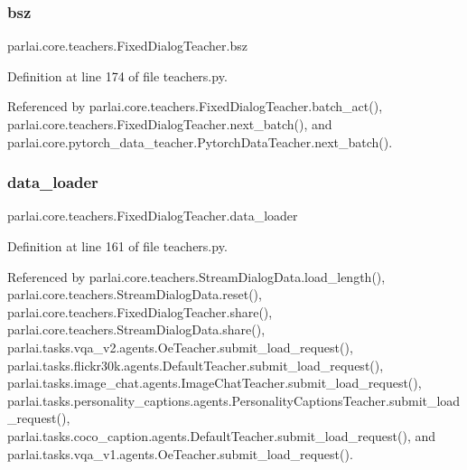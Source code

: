 \subsubsection{\texorpdfstring{bsz}{bsz}}
{\footnotesize\ttfamily parlai.\+core.\+teachers.\+Fixed\+Dialog\+Teacher.\+bsz}



Definition at line 174 of file teachers.\+py.



Referenced by parlai.\+core.\+teachers.\+Fixed\+Dialog\+Teacher.\+batch\+\_\+act(), parlai.\+core.\+teachers.\+Fixed\+Dialog\+Teacher.\+next\+\_\+batch(), and parlai.\+core.\+pytorch\+\_\+data\+\_\+teacher.\+Pytorch\+Data\+Teacher.\+next\+\_\+batch().

\mbox{\label{classparlai_1_1core_1_1teachers_1_1FixedDialogTeacher_a7edc6520195726382082a76486fa3747}} 
\subsubsection{\texorpdfstring{data\+\_\+loader}{data\_loader}}
{\footnotesize\ttfamily parlai.\+core.\+teachers.\+Fixed\+Dialog\+Teacher.\+data\+\_\+loader}



Definition at line 161 of file teachers.\+py.



Referenced by parlai.\+core.\+teachers.\+Stream\+Dialog\+Data.\+load\+\_\+length(), parlai.\+core.\+teachers.\+Stream\+Dialog\+Data.\+reset(), parlai.\+core.\+teachers.\+Fixed\+Dialog\+Teacher.\+share(), parlai.\+core.\+teachers.\+Stream\+Dialog\+Data.\+share(), parlai.\+tasks.\+vqa\+\_\+v2.\+agents.\+Oe\+Teacher.\+submit\+\_\+load\+\_\+request(), parlai.\+tasks.\+flickr30k.\+agents.\+Default\+Teacher.\+submit\+\_\+load\+\_\+request(), parlai.\+tasks.\+image\+\_\+chat.\+agents.\+Image\+Chat\+Teacher.\+submit\+\_\+load\+\_\+request(), parlai.\+tasks.\+personality\+\_\+captions.\+agents.\+Personality\+Captions\+Teacher.\+submit\+\_\+load\+\_\+request(), parlai.\+tasks.\+coco\+\_\+caption.\+agents.\+Default\+Teacher.\+submit\+\_\+load\+\_\+request(), and parlai.\+tasks.\+vqa\+\_\+v1.\+agents.\+Oe\+Teacher.\+submit\+\_\+load\+\_\+request().

